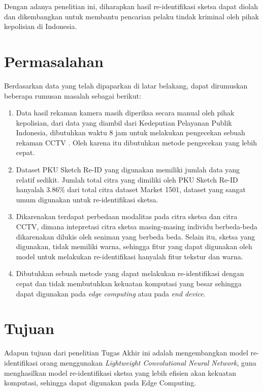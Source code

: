 Dengan adanya penelitian ini, diharapkan hasil re-identifikasi sketsa dapat diolah dan dikembangkan untuk membantu pencarian pelaku tindak kriminal oleh pihak kepolisian di Indonesia.

\vspace{1ex} 
\section{Permasalahan}
\vspace{1ex}
Berdasarkan data yang telah dipaparkan di latar belakang, dapat dirumuskan beberapa rumusan masalah sebagai berikut:
\begin{enumerate}
	\vspace{-1.3mm}
	\item Data hasil rekaman kamera masih diperiksa secara manual oleh pihak kepolisian, dari data yang diambil dari Kedeputian Pelayanan Publik Indonesia, dibutuhkan waktu 8 jam untuk melakukan pengecekan sebuah rekaman CCTV \cite{cit:3}. Oleh karena itu dibutuhkan metode pengecekan yang lebih cepat.
	\vspace{-2mm}
	\item Dataset PKU Sketch Re-ID yang digunakan memiliki jumlah data yang relatif sedikit. Jumlah total citra yang dimiliki oleh PKU Sketch Re-ID hanyalah 3.86\% dari total citra dataset Market 1501, dataset yang sangat umum digunakan untuk re-identifikasi sketsa.
	\vspace{-2mm}
	\item Dikarenakan terdapat perbedaan modalitas pada citra sketsa dan citra CCTV, dimana intepretasi citra sketsa masing-masing individu berbeda-beda dikarenakan dilukis oleh seniman yang berbeda beda. Selain itu, sketsa yang digunakan, tidak memiliki warna, sehingga fitur yang dapat digunakan oleh model untuk melakukan re-identifikasi hanyalah fitur tekstur dan warna.
	\vspace{-2mm}
	\item Dibutuhkan sebuah metode yang dapat melakukan re-identifikasi dengan cepat dan tidak membutuhkan kekuatan komputasi yang besar sehingga dapat digunakan pada \textit{edge computing} atau pada \textit{end device}.
\end{enumerate}

\section{Tujuan}
\vspace{1ex}

Adapun tujuan dari penelitian Tugas Akhir ini adalah mengembangkan model re-identifikasi orang menggunakan \textit{Lightweight Convolutional Neural Network}, guna menghasilkan model re-identifikasi sketsa yang lebih efisien akan kekuatan komputasi, sehingga dapat digunakan pada Edge Computing.

